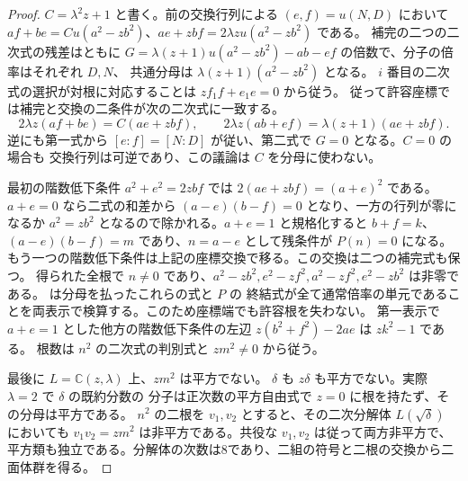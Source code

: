 \begin{proof}
$C=\lambda^2z+1$ と書く。前の交換行列による $(e,f)=u(N,D)$ において
$af+be=C u(a^2-zb^2)$、$ae+zbf=2\lambda z u(a^2-zb^2)$ である。
補完の二つの二次式の残差はともに
$G=\lambda(z+1)u(a^2-zb^2)-ab-ef$ の倍数で、分子の倍率はそれぞれ $D,N$、
共通分母は $\lambda(z+1)(a^2-zb^2)$ となる。
$i$ 番目の二次式の選択が対根に対応することは $zf_1 f+e_1 e=0$ から従う。
従って許容座標では補完と交換の二条件が次の二次式に一致する。
\[
 2\lambda z(af+be)=C(ae+zbf),\qquad
 2\lambda z(ab+ef)=\lambda(z+1)(ae+zbf).
\]
逆にも第一式から $[e:f]=[N:D]$ が従い、第二式で $G=0$ となる。$C=0$ の場合も
交換行列は可逆であり、この議論は $C$ を分母に使わない。

最初の階数低下条件 $a^2+e^2=2zbf$ では $2(ae+zbf)=(a+e)^2$ である。
$a+e=0$ なら二式の和差から $(a-e)(b-f)=0$ となり、一方の行列が零になるか
$a^2=zb^2$ となるので除かれる。$a+e=1$ と規格化すると $b+f=k$、
$(a-e)(b-f)=m$ であり、$n=a-e$ として残条件が $P(n)=0$ になる。
もう一つの階数低下条件は上記の座標交換で移る。この交換は二つの補完式も保つ。
得られた全根で $n\ne0$ であり、$a^2-zb^2,e^2-zf^2,a^2-zf^2,e^2-zb^2$ は非零である。
 は分母を払ったこれらの式と $P$ の
終結式が全て通常倍率の単元であることを両表示で検算する。このため座標端でも許容根を失わない。
第一表示で $a+e=1$ とした他方の階数低下条件の左辺 $z(b^2+f^2)-2ae$ は $zk^2-1$ である。
根数は $n^2$ の二次式の判別式と $zm^2\ne0$ から従う。

最後に $L=\mathbb C(z,\lambda)$ 上、$zm^2$ は平方でない。
$\delta$ も $z\delta$ も平方でない。実際 $\lambda=2$ で $\delta$ の既約分数の
分子は正次数の平方自由式で $z=0$ に根を持たず、その分母は平方である。
$n^2$ の二根を $v_1,v_2$ とすると、その二次分解体 $L(\sqrt\delta)$ においても
$v_1v_2=zm^2$ は非平方である。共役な $v_1,v_2$ は従って両方非平方で、
平方類も独立である。分解体の次数は8であり、二組の符号と二根の交換から二面体群を得る。
\end{proof}

